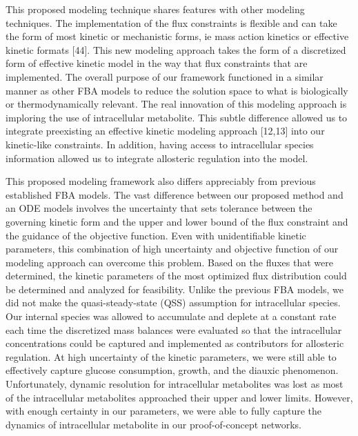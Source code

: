 \documentclass[12pt]{article}
\begin{document}
This proposed modeling technique shares features with other modeling techniques. The implementation of the flux constraints is flexible and can take the form of most kinetic or mechanistic forms, ie mass action kinetics or effective kinetic formats [44]. This new modeling approach takes the form of a discretized form of effective kinetic model in the way that flux constraints that are implemented. The overall purpose of our framework functioned in a similar manner as other FBA models to reduce the solution space to what is biologically or thermodynamically relevant. The real innovation of this modeling approach is imploring the use of intracellular metabolite. This subtle difference allowed us to integrate preexisting an effective kinetic modeling approach [12,13] into our kinetic-like constraints. In addition, having access to intracellular species information allowed us to integrate allosteric regulation into the model. 

This proposed modeling framework also differs appreciably from previous established FBA models. The vast difference between our proposed method and an ODE models involves the uncertainty that sets tolerance between the governing kinetic form and the upper and lower bound of the flux constraint and the guidance of the objective function. Even with unidentifiable kinetic parameters, this combination of high uncertainty and objective function of our modeling approach can overcome this problem. Based on the fluxes that were determined, the kinetic parameters of the most optimized flux distribution could be determined and analyzed for feasibility. Unlike the previous FBA models, we did not make the quasi-steady-state (QSS) assumption for intracellular species. Our internal species was allowed to accumulate and deplete at a constant rate each time the discretized mass balances were evaluated so that the intracellular concentrations could be captured and implemented as contributors for allosteric regulation. At high uncertainty of the kinetic parameters, we were still able to effectively capture glucose consumption, growth, and the diauxic phenomenon. Unfortunately, dynamic resolution for intracellular metabolites was lost as most of the intracellular metabolites approached their upper and lower limits. However, with enough certainty in our parameters, we were able to fully capture the dynamics of intracellular metabolite in our proof-of-concept networks. 
\end{document}
